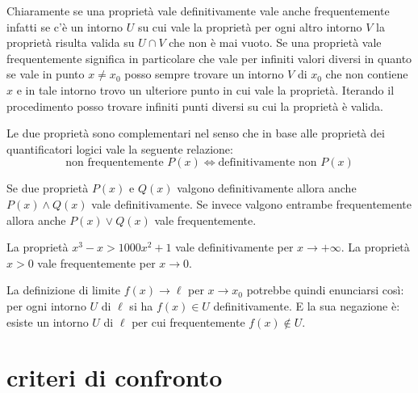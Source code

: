 Chiaramente se una proprietà vale definitivamente vale anche frequentemente
infatti se c'è un intorno $U$ su cui vale la proprietà per ogni altro intorno 
$V$ la proprietà risulta valida su $U\cap V$ che non è mai vuoto.
Se una proprietà vale frequentemente significa in particolare che vale per 
infiniti valori diversi in quanto se vale in punto $x\neq x_0$ 
posso sempre trovare un intorno $V$ di $x_0$ che non contiene $x$
e in tale intorno trovo un ulteriore punto in cui vale la proprietà. 
Iterando il procedimento posso trovare infiniti punti diversi su cui 
la proprietà è valida.

Le due proprietà sono complementari nel senso che
in base alle proprietà dei quantificatori logici vale 
la seguente relazione:
\[
  \text{non frequentemente $P(x)$} \iff
  \text{definitivamente non $P(x)$}
\]

Se due proprietà $P(x)$ e $Q(x)$ valgono definitivamente allora anche
$P(x)\land Q(x)$ vale definitivamente. Se invece valgono entrambe
frequentemente allora anche $P(x) \lor Q(x)$ vale frequentemente.

\begin{example}
La proprietà $x^3 - x > 1000 x^2 + 1$
vale definitivamente per $x\to +\infty$.
La proprietà $x>0$ vale frequentemente per $x\to 0$.
\end{example}


La definizione di limite $f(x) \to \ell$ per $x\to x_0$ 
potrebbe quindi enunciarsi così:
per ogni intorno $U$ di $\ell$ si ha $f(x)\in U$ definitivamente.
E la sua negazione è: esiste un intorno $U$ di $\ell$ per cui
frequentemente $f(x)\not\in U$.


\section{criteri di confronto}

